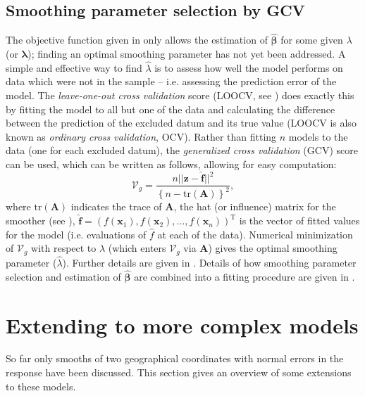 \subsection{Smoothing parameter selection by GCV}
\label{GAMfitting}

The objective function given in  only allows the estimation of $\bm{\hat{\beta}}$ for some given $\lambda$ (or $\bm{\lambda}$); finding an optimal smoothing parameter has not yet been addressed.  A simple and effective way to find $\hat{\lambda}$ is to assess how well the model performs on data which were not in the sample -- i.e. assessing the prediction error of the model. The \textit{leave-one-out cross validation} score (LOOCV, see ) does exactly this by fitting the model to all but one of the data and calculating the difference between the prediction of the excluded datum and its true value (LOOCV is also known as \textit{ordinary cross validation}, OCV). Rather than fitting $n$ models to the data (one for each excluded datum), the \textit{generalized cross validation} (GCV) score can be used, which can be written as follows, allowing for easy computation:
\begin{equation}
\mathcal{V}_g = \frac{n \lvert\lvert \mathbf{z} - \mathbf{\hat{f}}\rvert \rvert^2}{\left \{n-\text{tr}(\mathbf{A}) \right \}^2},
\label{intro-GCV}
\end{equation}
where $\text{tr}(\mathbf{A})$ indicates the trace of $\mathbf{A}$, the hat (or influence) matrix for the smoother (see ), $\mathbf{\hat{f}}=\left(f(\mathbf{x}_1), f(\mathbf{x}_2), \ldots, f(\mathbf{x}_n)\right)^\text{T}$ is the vector of fitted values for the model (i.e. evaluations of $\hat{f}$ at each of the data). Numerical minimization of $\mathcal{V}_g$ with respect to $\lambda$ (which enters $\mathcal{V}_g$ via $\mathbf{A}$) gives the optimal smoothing parameter ($\hat{\lambda}$). Further details are given in . Details of how smoothing parameter selection and estimation of $\bm{\hat{\beta}}$ are combined into a fitting procedure are given in .



\section{Extending to more complex models}
\label{intro-extending}

So far only smooths of two geographical coordinates with normal errors in the response have been discussed. This section gives an overview of some extensions to these models.

